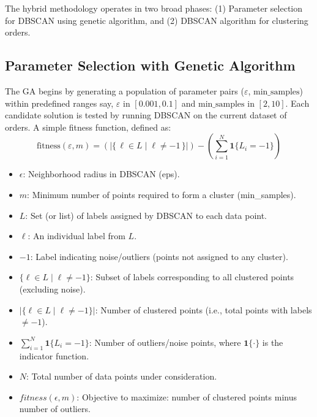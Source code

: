 The hybrid methodology operates in two broad phases: (1) Parameter selection for DBSCAN using genetic algorithm, and (2) DBSCAN algorithm for clustering orders.

\subsection{Parameter Selection with Genetic Algorithm}

The GA begins by generating a population of parameter pairs ($\varepsilon$, $\text{min\_samples}$) within predefined ranges say, $\varepsilon$ in $[0.001, 0.1]$ and $\text{min\_samples}$ in $[2, 10]$. Each candidate solution is tested by running DBSCAN on the current dataset of orders. A simple fitness function, defined as:
\begin{equation}
    \text{fitness}(\varepsilon, m) = \left( |\{\, \ell \in L \mid \ell \neq -1 \,\}| \right) - \left( \sum_{i=1}^{N} \mathbf{1}\{L_i = -1\} \right)
    \label{eq:fitness}
\end{equation}

\begin{itemize}
    \item \textbf{$\epsilon$}: Neighborhood radius in DBSCAN (eps).
    \item \textbf{$m$}: Minimum number of points required to form a cluster (min\_samples).
    \item \textbf{$L$}: Set (or list) of labels assigned by DBSCAN to each data point.
    \item \textbf{$\ell$}: An individual label from $L$.
    \item \textbf{$-1$}: Label indicating noise/outliers (points not assigned to any cluster).
    \item \textbf{$\{\ell \in L \mid \ell \neq -1\}$}: Subset of labels corresponding to all clustered points (excluding noise).
    \item \textbf{$\bigl|\{\ell \in L \mid \ell \neq -1\}\bigr|$}: Number of clustered points (i.e., total points with labels $\neq -1$).
    \item \textbf{$\sum_{i=1}^{N} \mathbf{1}\{L_i = -1\}$}: Number of outliers/noise points, where $\mathbf{1}\{\cdot\}$ is the indicator function.
    \item \textbf{$N$}: Total number of data points under consideration.
    \item \textbf{$fitness(\epsilon, m)$}: Objective to maximize: number of clustered points minus number of outliers.
\end{itemize}


